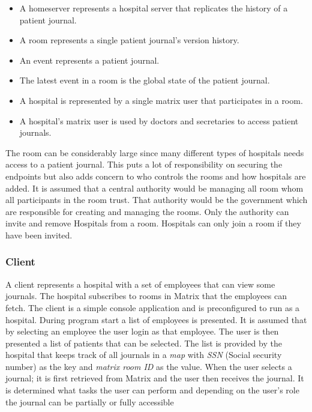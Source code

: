 \begin{itemize}
	\item A homeserver represents a hospital server that replicates the history of a patient journal. 
	\item A room represents a single patient journal's version history.
	\item An event represents a patient journal.  
	\item The latest event in a room is the global state of the patient journal.
	\item A hospital is represented by a single matrix user that participates in a room.
	\item A hospital's matrix user is used by doctors and secretaries to access patient journals. 
\end{itemize}


The room can be considerably large since many different types of hospitals needs access to a patient journal. This puts a lot of responsibility on securing the endpoints but also adds concern to who controls the rooms and how hospitals are added. It is assumed that a central authority would be managing all room whom all participants in the room trust. That authority would be the government which are responsible for creating and managing the rooms. Only the authority can invite and remove Hospitals from a room. Hospitals can only join a room if they have been invited.


\subsubsection{Client}

A client represents a hospital with a set of employees that can view some journals. The hospital subscribes to rooms in Matrix that the employees can fetch. The client is a simple console application and is preconfigured to run as a hospital. During program start a list of employees is presented. It is assumed that by selecting an employee the user login as that employee. The user is then presented a list of patients that can be selected. The list is provided by the hospital that keeps track of all journals in a \emph{map} with \emph{SSN} (Social security number) as the key and \emph{matrix room ID} as the value. When the user selects a journal; it is first retrieved from Matrix and the user then receives the journal. It is determined what tasks the user can perform and depending on the user's role the journal can be partially or fully accessible 

